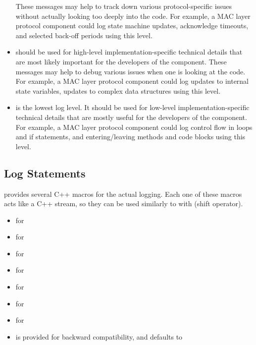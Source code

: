 \begin{itemize}
    These messages may help to track down various protocol-specific issues
    without actually looking too deeply into the code. For example, a MAC layer
    protocol component could log state machine updates, acknowledge timeouts,
    and selected back-off periods using this level.
  \item {} should be used for high-level
    implementation-specific technical details that are most likely important
    for the developers of the component. These messages may help to debug
    various issues when one is looking at the code. For example, a MAC layer
    protocol component could log updates to internal state variables, updates
    to complex data structures using this level.
  \item {} is the lowest log level. It should be used for
    low-level implementation-specific technical details that are mostly useful
    for the developers of the component. For example, a MAC layer protocol
    component could log control flow in loops and if statements, and
    entering/leaving methods and code blocks using this level.
\end{itemize}

\subsection{Log Statements}
\label{sec:sim-lib:log-statements}

{\opp} provides several C++ macros for the actual logging. Each one of these
macros acts like a C++ stream, so they can be used similarly to 
with  (shift operator).

\begin{itemize}
  \item {} for 
  \item {} for 
  \item {} for 
  \item {} for 
  \item {} for 
  \item {} for 
  \item {} for 
  \item {} is provided for backward compatibility, and defaults to 
\end{itemize}

